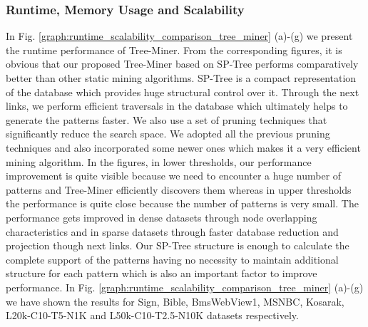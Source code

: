 \subsubsection{Runtime, Memory Usage and Scalability}
In Fig. \ref{graph:runtime_scalability_comparison_tree_miner} (a)-(g) we present the runtime performance of Tree-Miner. From the corresponding figures, it is obvious that our proposed Tree-Miner based on SP-Tree performs comparatively better than other static mining algorithms. SP-Tree is a compact representation of the database which provides huge structural control over it. Through the next links, we perform efficient traversals in the database which ultimately helps to generate the patterns faster. We also use a set of pruning techniques that significantly reduce the search space. We adopted all the previous pruning techniques and also incorporated some newer ones which makes it a very efficient mining algorithm. In the figures, in lower thresholds, our performance improvement is quite visible because we need to encounter a huge number of patterns and Tree-Miner efficiently discovers them whereas in upper thresholds the performance is quite close because the number of patterns is very small. The performance gets improved in dense datasets through node overlapping characteristics and in sparse datasets through faster database reduction and projection though next links. Our SP-Tree structure is enough to calculate the complete support of the patterns having no necessity to maintain additional structure for each pattern which is also an important factor to improve performance. In Fig. \ref{graph:runtime_scalability_comparison_tree_miner} (a)-(g) we have shown the results for Sign, Bible, BmsWebView1, MSNBC, Kosarak, L20k-C10-T5-N1K and L50k-C10-T2.5-N10K datasets respectively. 


